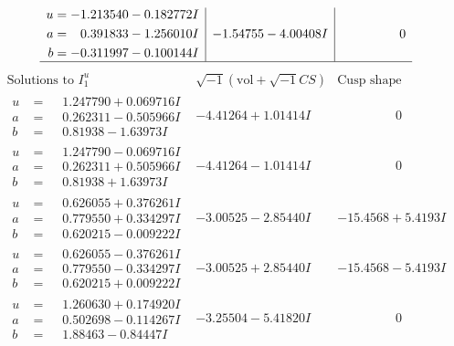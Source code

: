 \documentclass[1p]{elsarticle_modified}
\theoremstyle{definition}
\newcommand{\I}{\sqrt{-1}}
\begin{document}
$$\begin{array}{c|c|c}
\begin{aligned}
u &= -1.213540 - 0.182772 I \\
a &= \phantom{-}0.391833 - 1.256010 I \\
b &= -0.311997 - 0.100144 I\end{aligned}
 & -1.54755 - 4.00408 I & \phantom{-0.000000 } 0\\
 \hline 
 \end{array}$$\newpage$$\begin{array}{c|c|c}  
\text{Solutions to }I^u_{1}& \I (\text{vol} + \sqrt{-1}CS) & \text{Cusp shape}\\
 \hline 
\begin{aligned}
u &= \phantom{-}1.247790 + 0.069716 I \\
a &= \phantom{-}0.262311 - 0.505966 I \\
b &= \phantom{-}0.81938 - 1.63973 I\end{aligned}
 & -4.41264 + 1.01414 I & \phantom{-0.000000 } 0 \\ \hline\begin{aligned}
u &= \phantom{-}1.247790 - 0.069716 I \\
a &= \phantom{-}0.262311 + 0.505966 I \\
b &= \phantom{-}0.81938 + 1.63973 I\end{aligned}
 & -4.41264 - 1.01414 I & \phantom{-0.000000 } 0 \\ \hline\begin{aligned}
u &= \phantom{-}0.626055 + 0.376261 I \\
a &= \phantom{-}0.779550 + 0.334297 I \\
b &= \phantom{-}0.620215 - 0.009222 I\end{aligned}
 & -3.00525 - 2.85440 I & -15.4568 + 5.4193 I \\ \hline\begin{aligned}
u &= \phantom{-}0.626055 - 0.376261 I \\
a &= \phantom{-}0.779550 - 0.334297 I \\
b &= \phantom{-}0.620215 + 0.009222 I\end{aligned}
 & -3.00525 + 2.85440 I & -15.4568 - 5.4193 I \\ \hline\begin{aligned}
u &= \phantom{-}1.260630 + 0.174920 I \\
a &= \phantom{-}0.502698 - 0.114267 I \\
b &= \phantom{-}1.88463 - 0.84447 I\end{aligned}
 & -3.25504 - 5.41820 I & \phantom{-0.000000 } 0 \\ \hline\begin{aligned}

\end{aligned}
\end{array}$$
\end{document}
